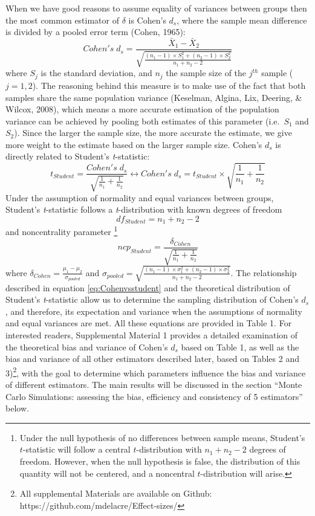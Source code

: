 \documentclass[
  english,
  man,floatsintext]{apa6}
\begin{document}
When we have good reasons to assume equality of variances between groups then the most common estimator of \(\delta\) is Cohen's \(d_{s}\), where the sample mean difference is divided by a pooled error term (Cohen, 1965):
\begin{equation*} 
Cohen's \; d_s = \frac{\bar{X}_1-\bar{X}_2}{\sqrt{\frac{(n_1-1) \times S_1^2+(n_2-1) \times S_2^2}{n_1+n_2-2}}}
\label{eq:Cohends}
\end{equation*}
where \(S_j\) is the standard deviation, and \(n_j\) the sample size of the \(j^{th}\) sample (\(j=1,2\)). The reasoning behind this measure is to make use of the fact that both samples share the same population variance (Keselman, Algina, Lix, Deering, \& Wilcox, 2008), which means a more accurate estimation of the population variance can be achieved by pooling both estimates of this parameter (i.e.~\(S_1\) and \(S_2\)). Since the larger the sample size, the more accurate the estimate, we give more weight to the estimate based on the larger sample size. Cohen's \(d_{s}\) is directly related to Student's \emph{t}-statistic:
\begin{equation} 
t_{Student}=\frac{Cohen's \; d_s}{\sqrt{\frac{1}{n_1}+\frac{1}{n_2}}}\leftrightarrow Cohen's \; d_s =  t_{Student} \times \sqrt{\frac{1}{n_1}+\frac{1}{n_2}}
\label{eq:Cohenvsstudent}
\end{equation}
Under the assumption of normality and equal variances between groups, Student's \emph{t}-statistic follows a \emph{t}-distribution with known degrees of freedom
\begin{equation} 
df_{Student} = n_1+n_2-2
\label{eq:studentdf}
\end{equation}
and noncentrality parameter \footnote{Under the null hypothesis of no differences between sample means, Student's $t$-statistic will follow a central $t$-distribution with $n_1+n_2-2$ degrees of freedom. However, when the null hypothesis is false, the distribution of this quantity will not be centered, and a noncentral $t$-distribution will arise.}
\[ncp_{Student} = \frac{\delta_{Cohen}}{\sqrt{\frac{1}{n_1}+\frac{1}{n_2}}}\]
where \(\delta_{Cohen}= \frac{\mu_1-\mu_2}{\sigma_{pooled}}\) and \(\sigma_{pooled}= \sqrt{\frac{(n_1-1) \times \sigma^2_1+(n_2-1) \times \sigma^2_2}{n_1+n_2-2}}\). The relationship described in equation \ref{eq:Cohenvsstudent} and the theoretical distribution of Student's \emph{t}-statistic allow us to determine the sampling distribution of Cohen's \(d_s\), and therefore, its expectation and variance when the assumptions of normality and equal variances are met. All these equations are provided in Table 1. For interested readers, Supplemental Material 1 provides a detailed examination of the theoretical bias and variance of Cohen's \(d_s\) based on Table 1, as well as the bias and variance of all other estimators described later, based on Tables 2 and 3)\footnote{All supplemental Materials are available on Github: https://github.com/mdelacre/Effect-sizes/}, with the goal to determine which parameters influence the bias and variance of different estimators. The main results will be discussed in the section \enquote{Monte Carlo Simulations: assessing the bias, efficiency and consistency of 5 estimators} below.
\end{document}
